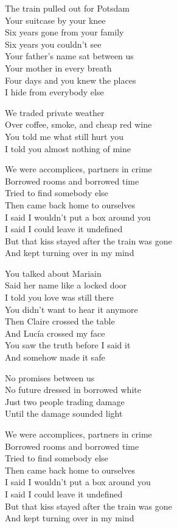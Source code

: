 \begin{lyrics}
The train pulled out for Potsdam\\
Your suitcase by your knee\\
Six years gone from your family\\
Six years you couldn't see\\
Your father's name sat between us\\
Your mother in every breath\\
Four days and you knew the places\\
I hide from everybody else

We traded private weather\\
Over coffee, smoke, and cheap red wine\\
You told me what still hurt you\\
I told you almost nothing of mine

We were accomplices, partners in crime\\
Borrowed rooms and borrowed time\\
Tried to find somebody else\\
Then came back home to ourselves\\
I said I wouldn't put a box around you\\
I said I could leave it undefined\\
But that kiss stayed after the train was gone\\
And kept turning over in my mind

You talked about Mariain\\
Said her name like a locked door\\
I told you love was still there\\
You didn't want to hear it anymore\\
Then Claire crossed the table\\
And Lucía crossed my face\\
You saw the truth before I said it\\
And somehow made it safe

No promises between us\\
No future dressed in borrowed white\\
Just two people trading damage\\
Until the damage sounded light

We were accomplices, partners in crime\\
Borrowed rooms and borrowed time\\
Tried to find somebody else\\
Then came back home to ourselves\\
I said I wouldn't put a box around you\\
I said I could leave it undefined\\
But that kiss stayed after the train was gone\\
And kept turning over in my mind


\end{lyrics}
